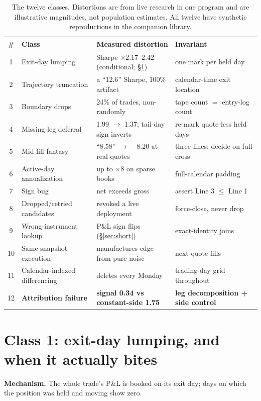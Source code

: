 \documentclass[11pt]{article}
\begin{document}
\begin{table}[t]\centering\small
\footnotesize\setlength{\tabcolsep}{3.5pt}
\begin{tabular}{clll}\toprule
\# & Class & Measured distortion & Invariant \\ \midrule
1 & Exit-day lumping & Sharpe $\times$2.17--2.42 (conditional; \S\ref{sec:lump}) & one mark per held day \\
2 & Trajectory truncation & a ``12.6'' Sharpe, 100\% artifact & calendar-time exit location \\
3 & Boundary drops & 24\% of trades, non-randomly & tape count $=$ entry-log count \\
4 & Missing-leg deferral & 1.99 $\to$ 1.37; tail-day sign inverts & re-mark quote-less held days \\
5 & Mid-fill fantasy & ``8.58'' $\to$ $-8.20$ at real quotes & three lines; decide on full cross \\
6 & Active-day annualization & up to $\times$8 on sparse books & full-calendar padding \\
7 & Sign bug & net exceeds gross & assert Line 3 $\le$ Line 1 \\
8 & Dropped/retried candidates & revoked a live deployment & force-close, never drop \\
9 & Wrong-instrument lookup & P\&L sign flips (\S\ref{sec:short}) & exact-identity joins \\
10 & Same-snapshot execution & manufactures edge from pure noise & next-quote fills \\
11 & Calendar-indexed differencing & deletes every Monday & trading-day grid throughout \\
12 & \textbf{Attribution failure} & \textbf{signal 0.34 vs constant-side 1.75} & \textbf{leg decomposition + side control} \\
\bottomrule\end{tabular}
\caption{The twelve classes. Distortions are from live research in one program and are
illustrative magnitudes, not population estimates. All twelve have synthetic reproductions in
the companion library.}
\label{tab:classes}\end{table}

\section{Class 1: exit-day lumping, and when it actually bites}\label{sec:lump}
\textbf{Mechanism.} The whole trade's P\&L is booked on its exit day; days on which the
position was held and moving show zero.
\end{document}
